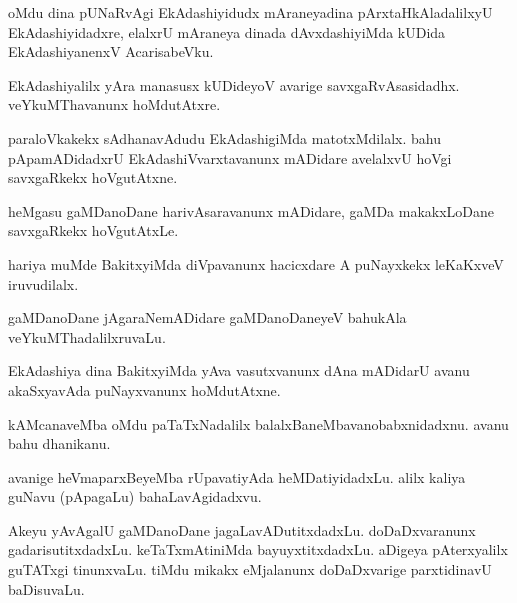\begin{mng}
oMdu dina pUNaRvAgi EkAdashiyidudx mAraneyadina pArxtaHkAladalilxyU EkAdashiyidadxre, elalxrU mAraneya dinada dAvxdashiyiMda kUDida EkAdashiyanenxV AcarisabeVku.
\end{mng}

\begin{mng}
EkAdashiyalilx yAra manasusx kUDideyoV avarige savxgaRvAsasidadhx. veYkuMThavanunx hoMdutAtxre.
\end{mng}

\begin{mng}
paraloVkakekx sAdhanavAdudu EkAdashigiMda matotxMdilalx. bahu pApamADidadxrU EkAdashiVvarxtavanunx mADidare avelalxvU hoVgi savxgaRkekx hoVgutAtxne.
\end{mng}

\begin{mng}
heMgasu gaMDanoDane harivAsaravanunx mADidare, gaMDa makakxLoDane savxgaRkekx hoVgutAtxLe.
\end{mng}

\begin{mng}
hariya muMde BakitxyiMda diVpavanunx hacicxdare A puNayxkekx leKaKxveV iruvudilalx.
\end{mng}

\begin{mng}
gaMDanoDane jAgaraNemADidare gaMDanoDaneyeV bahukAla veYkuMThadalilxruvaLu.
\end{mng}

\begin{mng}
EkAdashiya dina BakitxyiMda yAva vasutxvanunx dAna mADidarU avanu akaSxyavAda puNayxvanunx hoMdutAtxne.
\end{mng}

\begin{mng}
kAMcanaveMba oMdu paTaTxNadalilx balalxBaneMbavanobabxnidadxnu. avanu bahu dhanikanu.
\end{mng}

\begin{mng}
avanige heVmaparxBeyeMba rUpavatiyAda heMDatiyidadxLu. alilx kaliya guNavu (pApagaLu) bahaLavAgidadxvu.
\end{mng}

\begin{mng}
Akeyu yAvAgalU gaMDanoDane jagaLavADutitxdadxLu. doDaDxvaranunx gadarisutitxdadxLu. keTaTxmAtiniMda bayuyxtitxdadxLu. aDigeya pAterxyalilx guTATxgi tinunxvaLu. tiMdu mikakx eMjalanunx doDaDxvarige parxtidinavU baDisuvaLu.
\end{mng}

